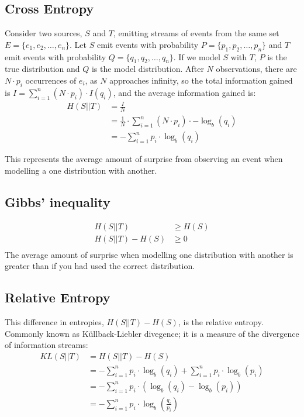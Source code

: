 \subsection{Cross Entropy}
\begin{mydef}
Consider two sources, $S$ and $T$, emitting streams of events from the same set $E = \{e_1, e_2, \ldots, e_n\}$.  Let $S$ emit events with probability $P = \{p_1, p_2, \ldots, p_n\}$ and $T$ emit events with probability $Q = \{q_1, q_2, \ldots, q_n\}$.  If we model $S$ with $T$, $P$ is the true distribution and $Q$ is the model distribution. After $N$ observations, there are $N \cdot p_i$ occurrences of $e_i$, as $N$ approaches infinity, so the total information gained is $I = \sum_{i = 1}^n (N \cdot p_i) \cdot I(q_i)$, and the average information gained is:
\begin{align*}
H(S||T) 	&= \frac{I}{N}\\
	 	&= \frac{1}{N} \cdot \sum_{i = 1}^n  (N \cdot p_i) \cdot -\log_b (q_i)\\
	 	&= -\sum_{i = 1}^n  p_i \cdot \log_b (q_i)
\end{align*}  
\end{mydef}
This represents the average amount of surprise from observing an event when modelling a one distribution with another.
\subsection{Gibbs' inequality}
\begin{align*}
H(S||T) 	&\geq  H(S)\\
H(S||T) - H(S) &\geq 0\\
\end{align*}
The average amount of surprise when modelling one distribution with another is greater than if you had used the correct distribution.
\subsection{Relative Entropy}
This difference in entropies, $H(S||T) - H(S)$, is the relative entropy. Commonly known as K\"ullback-Liebler divegence; it is a measure of the divergence of information streams:
\begin{align*} 
KL(S||T)		&= H(S||T) - H(S)\\
			&= -\sum_{i = 1}^n  p_i \cdot \log_b (q_i) + \sum_{i = 1}^n  p_i \cdot \log_b (p_i)\\
			&= -\sum_{i = 1}^n  p_i \cdot (\log_b (q_i) - \log_b (p_i))\\
			&= -\sum_{i = 1}^n  p_i \cdot \log_b (\frac{q_i}{p_i})
\end{align*}

